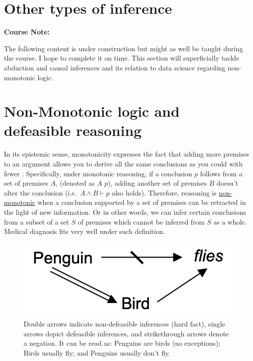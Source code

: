 \documentclass[
]{book}
\begin{document}
\hypertarget{other-types-of-inference}{%
\section{Other types of inference}\label{other-types-of-inference}}

\begin{notebox}

\begin{center}
\textbf{Course Note:}

\end{center}

The following content is under construction but might as well be taught during the course. I hope to complete it on time.
This section will superficially tackle abduction and causal inferences and its relation to data science regarding non-monotonic logic.

\end{notebox}

\hypertarget{non-monotonic-logic-and-defeasible-reasoning}{%
\section{Non-Monotonic logic and defeasible reasoning}\label{non-monotonic-logic-and-defeasible-reasoning}}

In its epistemic sense, monotonicity expresses the fact that adding more premises to an argument allows you to derive all the same conclusions as you could with fewer \citep{sep-logic-nonmonotonic}. Specifically, under monotonic reasoning, if a conclusion \(p\) follows from a set of premises \(A\), (denoted as \(A\) \vdash \(p\)), adding another set of premises \(B\) doesn't alter the conclusion (i.e.~\(A ∧ B \vdash p\) also holds). Therefore, reasoning is \href{https://plato.stanford.edu/entries/logic-nonmonotonic/}{non-monotonic} when a conclusion supported by a set of premises can be retracted in the light of new information. Or in other words, we can infer certain conclusions from a subset of a set \(S\) of premises which cannot be inferred from \(S\) as a whole. Medical diagnosis fits very well under such definition.

\begin{figure}

{\centering \includegraphics[width=0.33\linewidth]{Figures/PenguinFlies} 

}

\caption{Double arrows indicate non-defeasible inferences (hard fact), single arrows depict defeasible inferences, and strikethrough arrows denote a negation. It can be read as: Penguins are birds (no exceptions); Birds usually fly; and Penguins usually don’t fly.}\label{fig:tweety}
\end{figure}
\end{document}
